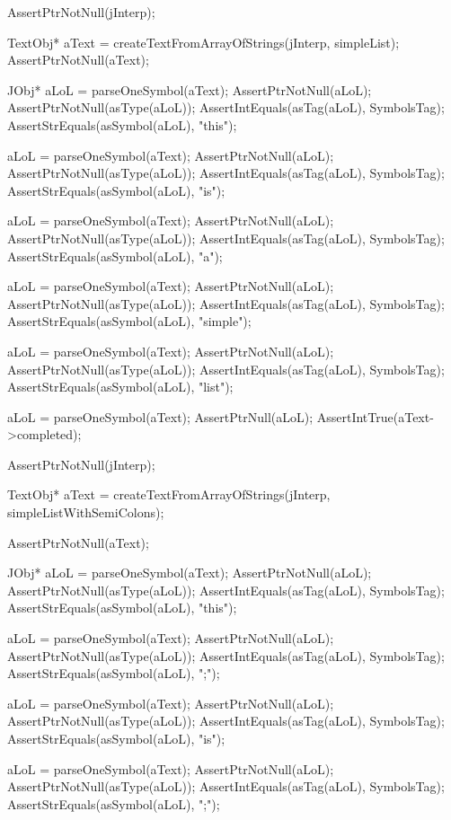 \startCTest
  AssertPtrNotNull(jInterp);

  TextObj* aText =
    createTextFromArrayOfStrings(jInterp, simpleList);
  AssertPtrNotNull(aText);

  JObj* aLoL = parseOneSymbol(aText);
  AssertPtrNotNull(aLoL);
  AssertPtrNotNull(asType(aLoL));
  AssertIntEquals(asTag(aLoL), SymbolsTag);
  AssertStrEquals(asSymbol(aLoL), "this");

  aLoL = parseOneSymbol(aText);
  AssertPtrNotNull(aLoL);
  AssertPtrNotNull(asType(aLoL));
  AssertIntEquals(asTag(aLoL), SymbolsTag);
  AssertStrEquals(asSymbol(aLoL), "is");

  aLoL = parseOneSymbol(aText);
  AssertPtrNotNull(aLoL);
  AssertPtrNotNull(asType(aLoL));
  AssertIntEquals(asTag(aLoL), SymbolsTag);
  AssertStrEquals(asSymbol(aLoL), "a");

  aLoL = parseOneSymbol(aText);
  AssertPtrNotNull(aLoL);
  AssertPtrNotNull(asType(aLoL));
  AssertIntEquals(asTag(aLoL), SymbolsTag);
  AssertStrEquals(asSymbol(aLoL), "simple");

  aLoL = parseOneSymbol(aText);
  AssertPtrNotNull(aLoL);
  AssertPtrNotNull(asType(aLoL));
  AssertIntEquals(asTag(aLoL), SymbolsTag);
  AssertStrEquals(asSymbol(aLoL), "list");

  aLoL = parseOneSymbol(aText);
  AssertPtrNull(aLoL);
  AssertIntTrue(aText->completed);
\stopCTest
\stopTestCase

\startCTest
  AssertPtrNotNull(jInterp);

  TextObj* aText =
    createTextFromArrayOfStrings(jInterp, simpleListWithSemiColons);

  AssertPtrNotNull(aText);

  JObj* aLoL = parseOneSymbol(aText);
  AssertPtrNotNull(aLoL);
  AssertPtrNotNull(asType(aLoL));
  AssertIntEquals(asTag(aLoL), SymbolsTag);
  AssertStrEquals(asSymbol(aLoL), "this");

  aLoL = parseOneSymbol(aText);
  AssertPtrNotNull(aLoL);
  AssertPtrNotNull(asType(aLoL));
  AssertIntEquals(asTag(aLoL), SymbolsTag);
  AssertStrEquals(asSymbol(aLoL), ";");

  aLoL = parseOneSymbol(aText);
  AssertPtrNotNull(aLoL);
  AssertPtrNotNull(asType(aLoL));
  AssertIntEquals(asTag(aLoL), SymbolsTag);
  AssertStrEquals(asSymbol(aLoL), "is");

  aLoL = parseOneSymbol(aText);
  AssertPtrNotNull(aLoL);
  AssertPtrNotNull(asType(aLoL));
  AssertIntEquals(asTag(aLoL), SymbolsTag);
  AssertStrEquals(asSymbol(aLoL), ";");

